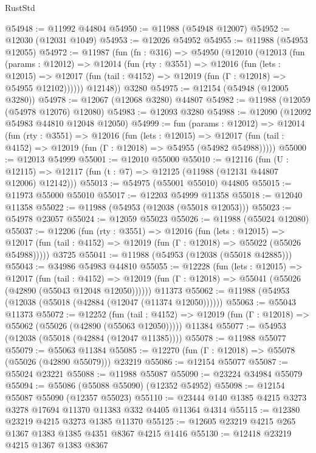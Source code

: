 \begin{lexlean}{RustStd}
\begin{coremodule}
@54948 := @11992 @44804
@54950 := @11988 (@54948 @12007)
@54952 := @12030 (@12031 @1049)
@54953 := @12026 @54952
@54955 := @11988 (@54953 @12055)
@54972 := @11987
    (fun (fn : @316) =>
    @54950
      (@12010
        (@12013
          (fun (params : @12012) =>
          @12014
            (fun (rty : @3551) =>
            @12016
              (fun (lets : @12015) =>
              @12017 (fun (tail : @4152) => @12019 (fun (Γ : @12018) => @54955 @12102))))))
        @12148))
    @3280
@54975 := @12154 (@54948 (@12005 @3280))
@54978 := @12067 (@12068 @3280) @44807
@54982 := @11988 (@12059 (@54978 @12076) @12080)
@54983 := @12093 @3280
@54988 := @12090 (@12092 @54983 @44810 @12048 @12050)
@54999 := fun (params : @12012) =>
  @12014
    (fun (rty : @3551) =>
    @12016
      (fun (lets : @12015) =>
      @12017 (fun (tail : @4152) => @12019 (fun (Γ : @12018) => @54955 (@54982 @54988)))))
@55000 := @12013 @54999
@55001 := @12010 @55000
@55010 := @12116
    (fun (U : @12115) => @12117 (fun (t : @7) => @12125 (@11988 (@12131 @44807 @12006) @12142)))
@55013 := @54975 (@55001 @55010) @44805
@55015 := @11973 @55000 @55010
@55017 := @12203 @54999 @11358
@55018 := @12040 @11358
@55022 := @11988 (@54953 (@12038 (@55018 @12053)))
@55023 := @54978 @23057
@55024 := @12059 @55023
@55026 := @11988 (@55024 @12080)
@55037 := @12206
    (fun (rty : @3551) =>
    @12016
      (fun (lets : @12015) =>
      @12017 (fun (tail : @4152) => @12019 (fun (Γ : @12018) => @55022 (@55026 @54988)))))
    @3725
@55041 := @11988 (@54953 (@12038 (@55018 @42885)))
@55043 := @34986 @54983 @44810
@55055 := @12228
    (fun (lets : @12015) =>
    @12017
      (fun (tail : @4152) =>
      @12019 (fun (Γ : @12018) => @55041 (@55026 (@42890 (@55043 @12048 @12050))))))
    @11373
@55062 := @11988 (@54953 (@12038 (@55018 (@42884 (@12047 (@11374 @12050))))))
@55063 := @55043 @11373
@55072 := @12252
    (fun (tail : @4152) => @12019 (fun (Γ : @12018) => @55062 (@55026 (@42890 (@55063 @12050)))))
    @11384
@55077 := @54953 (@12038 (@55018 (@42884 (@12047 @11385))))
@55078 := @11988 @55077
@55079 := @55063 @11384
@55085 := @12270 (fun (Γ : @12018) => @55078 (@55026 (@42890 @55079))) @23219
@55086 := @12154 @55077
@55087 := @55024 @23221
@55088 := @11988 @55087
@55090 := @23224 @34984 @55079
@55094 := @55086 (@55088 @55090) (@12352 @54952)
@55098 := @12154 @55087 @55090 (@12357 @55023)
@55110 := @23444 @140 @1385 @4215 @3273 @3278 @17694 @11370 @11383 @332 @4405 @11364 @4314
@55115 := @12380 @23219 @4215 @3273 @1385 @11370
@55125 := @12605 @23219 @4215 @265 @1367 @1383 @1385 @4351 @8367 @4215 @1416
@55130 := @12418 @23219 @4215 @1367 @1383 @8367

\end{coremodule}
\end{lexlean}
